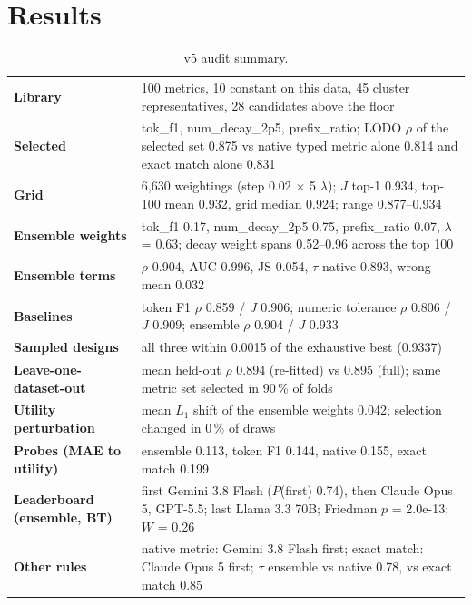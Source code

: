 \documentclass[11pt]{article}
\begin{document}
\section{Results}
\begin{table}[htbp]\centering\small\caption{v5 audit summary.}\label{tab:v5_summary}
\begin{tabularx}{\textwidth}{>{\bfseries}p{} L}\toprule
Library & 100 metrics, 10 constant on this data, 45 cluster representatives, 28 candidates above the floor \\
Selected & tok\_\allowbreak{}f1, num\_\allowbreak{}decay\_\allowbreak{}2p5, prefix\_\allowbreak{}ratio; LODO $\rho$ of the selected set 0.875 vs native typed metric alone 0.814 and exact match alone 0.831 \\
Grid & 6,630 weightings (step 0.02 $\times$ 5 $\lambda$); $J$ top-1 0.934, top-100 mean 0.932, grid median 0.924; range 0.877--0.934 \\
Ensemble weights & tok\_\allowbreak{}f1 0.17, num\_\allowbreak{}decay\_\allowbreak{}2p5 0.75, prefix\_\allowbreak{}ratio 0.07, $\lambda$ = 0.63; decay weight spans 0.52--0.96 across the top 100 \\
Ensemble terms & $\rho$ 0.904, AUC 0.996, JS 0.054, $\tau$ native 0.893, wrong mean 0.032 \\
Baselines & token F1 $\rho$ 0.859 / $J$ 0.906; numeric tolerance $\rho$ 0.806 / $J$ 0.909; ensemble $\rho$ 0.904 / $J$ 0.933 \\
Sampled designs & all three within 0.0015 of the exhaustive best (0.9337) \\
Leave-one-dataset-out & mean held-out $\rho$ 0.894 (re-fitted) vs 0.895 (full); same metric set selected in 90\,\% of folds \\
Utility perturbation & mean $L_1$ shift of the ensemble weights 0.042; selection changed in 0\,\% of draws \\
Probes (MAE to utility) & ensemble 0.113, token F1 0.144, native 0.155, exact match 0.199 \\
Leaderboard (ensemble, BT) & first Gemini 3.8 Flash ($P$(first) 0.74), then Claude Opus 5, GPT-5.5; last Llama 3.3 70B; Friedman $p$ = 2.0e-13; $W$ = 0.26 \\
Other rules & native metric: Gemini 3.8 Flash first; exact match: Claude Opus 5 first; $\tau$ ensemble vs native 0.78, vs exact match 0.85 \\
\bottomrule\end{tabularx}\end{table}
\end{document}
